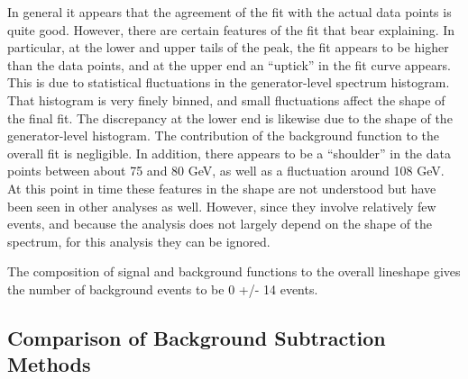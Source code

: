 
In general it appears that the agreement of the fit 
with the actual data points is quite good.  
However, there are certain features of the fit 
that bear explaining.  
In particular, 
at the lower and upper tails of the peak, 
the fit appears to be higher than the data points, 
and at the upper end an ``uptick'' in the fit 
curve appears.  
This is due to statistical fluctuations in 
the generator-level \Zee spectrum histogram.  
That histogram is very finely binned, 
and small fluctuations affect the shape of the final fit.  
The discrepancy at the lower end is likewise 
due to the shape of the generator-level histogram.  
The contribution of the background function to the 
overall fit is negligible.  
In addition, there appears to be a ``shoulder'' 
in the data points between about 75 and 80 GeV, 
as well as a fluctuation around 108 GeV.  
At this point in time these features in the shape 
are not understood but have been seen in 
other analyses as well.  %
However, since they involve relatively few events, 
and because the analysis does not largely 
depend on the shape of the spectrum, 
for this analysis they can be ignored.  

The composition of signal and background 
functions to the overall lineshape 
gives the number of background events 
to be 0 +/- 14 events.  


\subsection{Comparison of Background Subtraction Methods}
\label{anMeth:BGSubComp}


